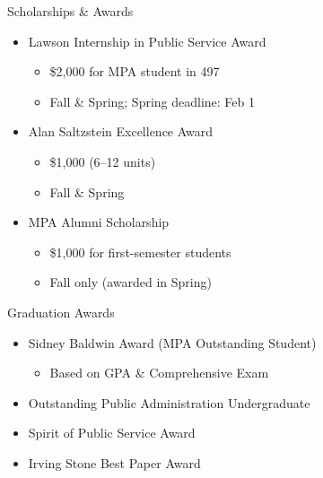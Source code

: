 \documentclass[10pt]{beamer}
\begin{document}
\begin{frame}{Scholarships \& Awards}
\begin{itemize}
  \item Lawson Internship in Public Service Award
    \begin{itemize}
      \item \$2{,}000 for MPA student in 497
      \item Fall \& Spring; Spring deadline: Feb 1
    \end{itemize}
  \item Alan Saltzstein Excellence Award
    \begin{itemize}
      \item \$1{,}000 (6--12 units)
      \item Fall \& Spring
    \end{itemize}
  \item MPA Alumni Scholarship
    \begin{itemize}
      \item \$1{,}000 for first-semester students
      \item Fall only (awarded in Spring)
    \end{itemize}
\end{itemize}
\end{frame}

\begin{frame}{Graduation Awards}
\begin{itemize}
  \item Sidney Baldwin Award (MPA Outstanding Student)
    \begin{itemize}
      \item Based on GPA \& Comprehensive Exam
    \end{itemize}
  \item Outstanding Public Administration Undergraduate
  \item Spirit of Public Service Award
  \item Irving Stone Best Paper Award
\end{itemize}
\end{frame}
\end{document}
